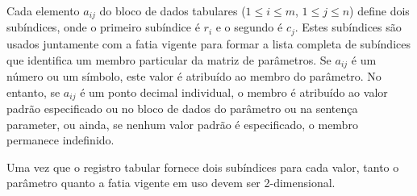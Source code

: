 \documentclass[11pt, brazil]{report}
\begin{document}
Cada elemento $a_{ij}$ do bloco de dados tabulares ($1\leq i\leq m$,
$1\leq j\leq n$) define dois subíndices, onde o primeiro subíndice é
$r_i$ e o segundo é $c_j$. Estes subíndices são usados juntamente com
a fatia vigente para formar a lista completa de subíndices que identifica
um membro particular da matriz de parâmetros. Se $a_{ij}$
é um número ou um símbolo, este valor é atribuído ao membro do parâmetro.
No entanto, se $a_{ij}$ é um ponto decimal individual, o membro é atribuído
ao valor padrão especificado ou no bloco de dados do parâmetro
ou na sentença parameter, ou ainda, se nenhum valor padrão é especificado,
o membro permanece indefinido.

Uma vez que o registro tabular fornece dois subíndices para cada valor,
tanto o parâmetro quanto a fatia vigente em uso devem ser 2-dimensional.


%
%
\end{document}
